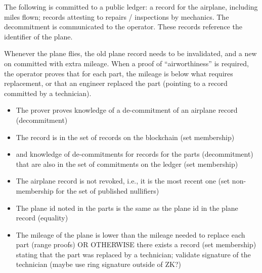 The following is committed to a public ledger:
a record for the airplane, including miles flown;
records attesting to repairs / inspections by mechanics.
The decommitment is communicated to the operator.
These records reference the identifier of the plane.


Whenever the plane flies, the old plane record needs to be invalidated, and a new on committed with extra mileage. When a proof of ``airworthiness'' is required, the operator proves that for each part, the mileage is below what requires replacement, or that an engineer replaced the part (pointing to a record committed by a technician).


\begin{itemize}
    \item The prover proves knowledge of a de-commitment of an airplane record (decommitment) 
    \item The record is in the set of records on the blockchain (set membership)
    \item and knowledge of de-commitments for records for the parts (decommitment) that are also in the set of commitments on the ledger (set membership)
    \item The airplane record is not revoked, i.e., it is the most recent one (set non-membership for the set of published nullifiers)
    \item The plane id noted in the parts is the same as the plane id in the plane record  (equality) 
    \item The mileage of the plane is lower than the mileage needed to replace each part (range proofs) OR OTHERWISE 
    there exists a record (set membership) stating that the part was replaced by a technician; validate signature of the technician (maybe use ring signature outside of ZK?)\loosen
\end{itemize}
